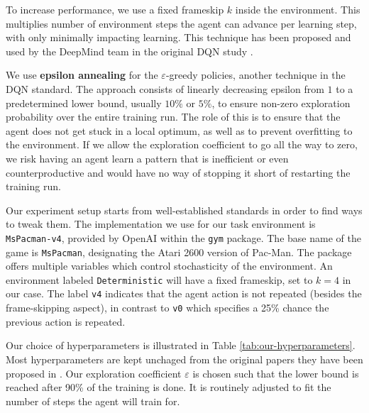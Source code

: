 To increase performance, we use a fixed frameskip $k$ inside the environment.
This multiplies number of environment steps the agent can advance per learning step, with only minimally impacting learning.
This technique\footnotemark{} has been proposed and used by the DeepMind team in the original DQN study \cite{atari-dqn}.

We use \textbf{epsilon annealing} for the $\varepsilon$-greedy policies, another technique in the DQN standard.
The approach consists of linearly decreasing epsilon from $1$ to a predetermined lower bound, usually $10\%$ or $5\%$, to ensure non-zero exploration probability over the entire training run.
The role of this is to ensure that the agent does not get stuck in a local optimum, as well as to prevent overfitting to the environment.
If we allow the exploration coefficient to go all the way to zero, we risk having an agent learn a pattern that is inefficient or even counterproductive and would have no way of stopping it short of restarting the training run.

Our experiment setup starts from well-established standards in order to find ways to tweak them.
The implementation we use for our task environment is \texttt{MsPacman-v4}, provided by OpenAI within the \texttt{gym} package.
The base name of the game is \texttt{MsPacman}, designating the Atari 2600 version of Pac-Man.
The package offers multiple variables which control stochasticity of the environment.
An environment labeled \texttt{Deterministic} will have a fixed frameskip, set to $k = 4$ in our case.
The label \texttt{v4} indicates that the agent action is not repeated (besides the frame-skipping aspect), in contrast to \texttt{v0} which specifies a 25\% chance the previous action is repeated.

Our choice of hyperparameters is illustrated in Table \ref{tab:our-hyperparameters}.
Most hyperparameters are kept unchaged from the original papers they have been proposed in \cite{atari-dqn, per-paper}.
Our exploration coefficient $\varepsilon$ is chosen such that the lower bound is reached after 90\% of the training is done.
It is routinely adjusted to fit the number of steps the agent will train for.


